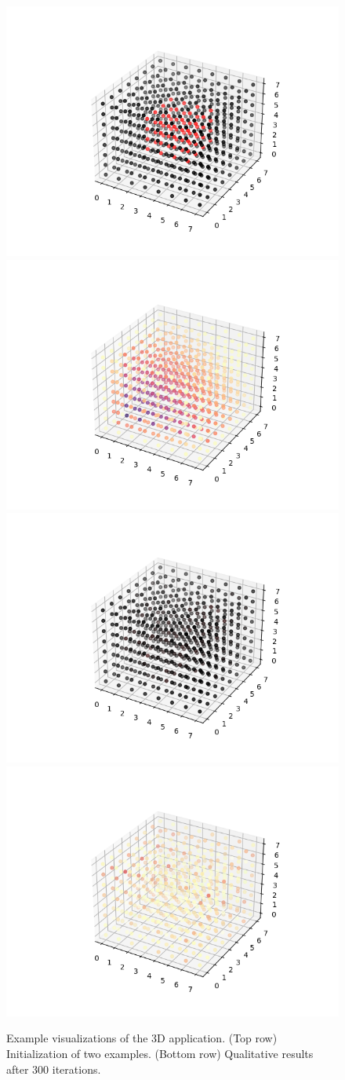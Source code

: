 \documentclass[sigconf]{acmart}
\begin{document}
\begin{figure}
    \centering
    \includegraphics[width=0.49\linewidth]{figs/3d_center_init.png}
    \includegraphics[width=0.49\linewidth]{figs/3d_pretty_init.png}
    \includegraphics[width=0.49\linewidth]{figs/3d_center_end.png}
    \includegraphics[width=0.49\linewidth]{figs/3d_pretty_end.png}
    \caption{Example visualizations of the 3D application. (Top row) Initialization of two examples. (Bottom row) Qualitative results after 300 iterations.
    \label{fig:3d-vis}}
\end{figure}
\end{document}
